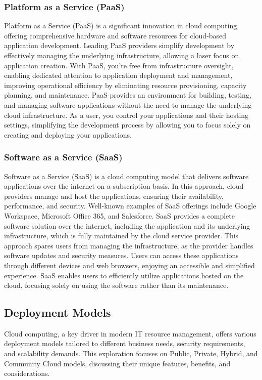 \subsubsection{Platform as a Service (PaaS)}
Platform as a Service (PaaS) is a significant innovation in cloud computing, offering comprehensive
hardware and software resources for cloud-based application development. Leading PaaS providers
simplify development by effectively managing the underlying infrastructure, allowing a laser focus
on application creation. With PaaS, you're free from infrastructure oversight, enabling dedicated
attention to application deployment and management, improving operational efficiency by eliminating
resource provisioning, capacity planning, and maintenance. PaaS provides an environment for
building, testing, and managing software applications without the need to manage the underlying
cloud infrastructure. As a user, you control your applications and their hosting settings,
simplifying the development process by allowing you to focus solely on creating and deploying your
applications.

\subsubsection{Software as a Service (SaaS)}
Software as a Service (SaaS) is a cloud computing model that delivers software applications over the
internet on a subscription basis. In this approach, cloud providers manage and host the
applications, ensuring their availability, performance, and security. Well-known examples of SaaS
offerings include Google Workspace, Microsoft Office 365, and Salesforce. SaaS provides a complete
software solution over the internet, including the application and its underlying infrastructure,
which is fully maintained by the cloud service provider. This approach spares users from managing
the infrastructure, as the provider handles software updates and security measures. Users can access
these applications through different devices and web browsers, enjoying an accessible and simplified
experience. SaaS enables users to efficiently utilize applications hosted on the cloud, focusing
solely on using the software rather than its maintenance.

\subsection{Deployment Models}
Cloud computing, a key driver in modern IT resource management, offers various deployment models
tailored to different business needs, security requirements, and scalability demands. This
exploration focuses on Public, Private, Hybrid, and Community Cloud models, discussing their unique
features, benefits, and considerations.

